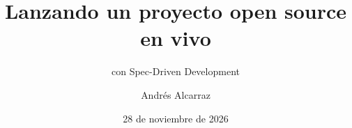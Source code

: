 \documentclass{presentacion}
\title{Lanzando un proyecto open source en vivo}
\subtitle{con Spec-Driven Development}
\author{Andrés Alcarraz}
\institute{Peru JUG - JConf Perú 2026}
\date{28 de noviembre de 2026}
\begin{document}
\portada









\end{document}
